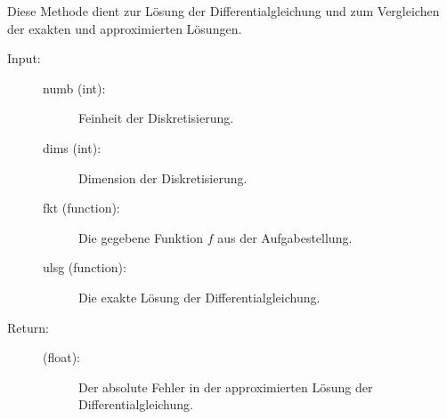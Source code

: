 \documentclass[letterpaper,10pt,ngerman, oneside, openright]{sphinxmanual}
\begin{document}
\begin{fulllineitems}
\label{\detokenize{index:aufg_3_2u3_main.loesg}}
Diese Methode dient zur Lösung der Differentialgleichung und zum Vergleichen der exakten
und approximierten Lösungen.
\begin{description}
\item [{Input:}] \leavevmode
\begin{description}
\item[{numb (int):}] \leavevmode
Feinheit der Diskretisierung.

\item[{dims (int):}] \leavevmode
Dimension der Diskretisierung.

\item[{fkt (function):}] \leavevmode
Die gegebene Funktion $f$ aus der Aufgabestellung.

\item[{ulsg (function):}] \leavevmode
Die exakte Lösung der Differentialgleichung.

\end{description}\end{description}

\begin{description}
\item[{Return:}] \leavevmode\begin{description}
\item[{(float):}] \leavevmode
Der absolute Fehler in der approximierten Lösung der Differentialgleichung.

\end{description}

\end{description}

\end{fulllineitems}

\end{document}
